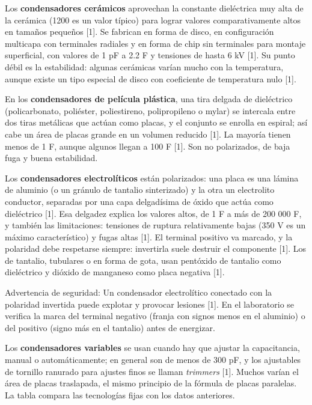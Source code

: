 \documentclass[11pt,letterpaper]{article}
\begin{document}
Los \textbf{condensadores cerámicos} aprovechan la constante dieléctrica muy alta de la cerámica (1200 es un valor típico) para lograr valores comparativamente altos en tamaños pequeños [1]. Se fabrican en forma de disco, en configuración multicapa con terminales radiales y en forma de chip sin terminales para montaje superficial, con valores de 1 pF a 2.2 \textmu{}F y tensiones de hasta 6 kV [1]. Su punto débil es la estabilidad: algunas cerámicas varían mucho con la temperatura, aunque existe un tipo especial de disco con coeficiente de temperatura nulo [1].

En los \textbf{condensadores de película plástica}, una tira delgada de dieléctrico (policarbonato, poliéster, poliestireno, polipropileno o mylar) se intercala entre dos tiras metálicas que actúan como placas, y el conjunto se enrolla en espiral; así cabe un área de placas grande en un volumen reducido [1]. La mayoría tienen menos de 1 \textmu{}F, aunque algunos llegan a 100 \textmu{}F [1]. Son no polarizados, de baja fuga y buena estabilidad.

Los \textbf{condensadores electrolíticos} están polarizados: una placa es una lámina de aluminio (o un gránulo de tantalio sinterizado) y la otra un electrolito conductor, separadas por una capa delgadísima de óxido que actúa como dieléctrico [1]. Esa delgadez explica los valores altos, de 1 \textmu{}F a más de 200 000 \textmu{}F, y también las limitaciones: tensiones de ruptura relativamente bajas (350 V es un máximo característico) y fugas altas [1]. El terminal positivo va marcado, y la polaridad debe respetarse siempre: invertirla suele destruir el componente [1]. Los de tantalio, tubulares o en forma de gota, usan pentóxido de tantalio como dieléctrico y dióxido de manganeso como placa negativa [1].

\begin{nota}{Advertencia de seguridad:}
Un condensador electrolítico conectado con la polaridad invertida puede explotar y provocar lesiones [1]. En el laboratorio se verifica la marca del terminal negativo (franja con signos menos en el aluminio) o del positivo (signo más en el tantalio) antes de energizar.
\end{nota}

Los \textbf{condensadores variables} se usan cuando hay que ajustar la capacitancia, manual o automáticamente; en general son de menos de 300 pF, y los ajustables de tornillo ranurado para ajustes finos se llaman \textit{trimmers} [1]. Muchos varían el área de placas traslapada, el mismo principio de la fórmula de placas paralelas. La tabla compara las tecnologías fijas con los datos anteriores.
\end{document}
